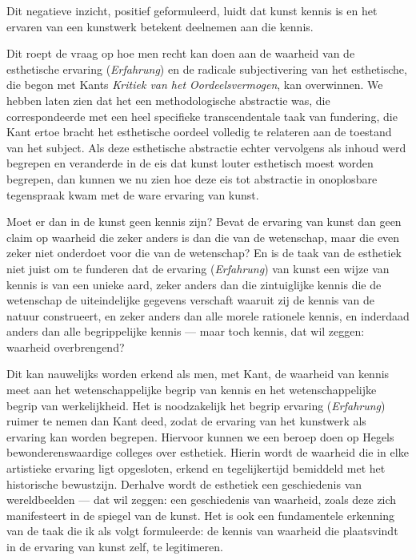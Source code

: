 Dit negatieve inzicht, positief geformuleerd, luidt dat kunst kennis is en het ervaren van een kunstwerk betekent deelnemen aan die kennis.

Dit roept de vraag op hoe men recht kan doen aan de waarheid van de esthetische ervaring (\textit{Erfahrung}) en de radicale subjectivering van het esthetische, die begon met Kants \textit{Kritiek van het Oordeelsvermogen}, kan overwinnen. We hebben laten zien dat het een methodologische abstractie was, die correspondeerde met een heel specifieke transcendentale taak van fundering, die Kant ertoe bracht het esthetische oordeel volledig te relateren aan de toestand van het subject. Als deze esthetische abstractie echter vervolgens als inhoud werd begrepen en veranderde in de eis dat kunst louter esthetisch moest worden begrepen, dan kunnen we nu zien hoe deze eis tot abstractie in onoplosbare tegenspraak kwam met de ware ervaring van kunst.

Moet er dan in de kunst geen kennis zijn? Bevat de ervaring van kunst dan geen claim op waarheid die zeker anders is dan die van de wetenschap, maar die even zeker niet onderdoet voor die van de wetenschap? En is de taak van de esthetiek niet juist om te funderen dat de ervaring (\textit{Erfahrung}) van kunst een wijze van kennis is van een unieke aard, zeker anders dan die zintuiglijke kennis die de wetenschap de uiteindelijke gegevens verschaft waaruit zij de kennis van de natuur construeert, en zeker anders dan alle morele rationele kennis, en inderdaad anders dan alle begrippelijke kennis — maar toch kennis, dat wil zeggen: waarheid overbrengend?

Dit kan nauwelijks worden erkend als men, met Kant, de waarheid van kennis meet aan het wetenschappelijke begrip van kennis en het wetenschappelijke begrip van werkelijkheid. Het is noodzakelijk het begrip ervaring (\textit{Erfahrung}) ruimer te nemen dan Kant deed, zodat de ervaring van het kunstwerk als ervaring kan worden begrepen. Hiervoor kunnen we een beroep doen op Hegels bewonderenswaardige colleges over esthetiek. Hierin wordt de waarheid die in elke artistieke ervaring ligt opgesloten, erkend en tegelijkertijd bemiddeld met het historische bewustzijn. Derhalve wordt de esthetiek een geschiedenis van wereldbeelden — dat wil zeggen: een geschiedenis van waarheid, zoals deze zich manifesteert in de spiegel van de kunst. Het is ook een fundamentele erkenning van de taak die ik als volgt formuleerde: de kennis van waarheid die plaatsvindt in de ervaring van kunst zelf, te legitimeren.

